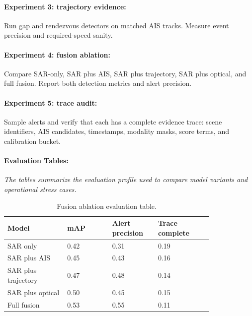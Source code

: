 \documentclass{article}
\begin{document}
\paragraph{Experiment 3: trajectory evidence:}

Run gap and rendezvous detectors on matched AIS tracks. Measure event precision and required-speed sanity.

\paragraph{Experiment 4: fusion ablation:}

Compare SAR-only, SAR plus AIS, SAR plus trajectory, SAR plus optical, and full fusion. Report both detection metrics and alert precision.

\paragraph{Experiment 5: trace audit:}

Sample alerts and verify that each has a complete evidence trace: scene identifiers, AIS candidates, timestamps, modality masks, score terms, and calibration bucket.

\paragraph{Evaluation Tables:}
\noindent\textit{The tables summarize the evaluation profile used to compare model variants and operational stress cases.}

\begin{table}[t]
\centering
\caption{Fusion ablation evaluation table.}
\begin{tabular}{@{}p{0.24\linewidth}p{0.18\linewidth}p{0.18\linewidth}p{0.22\linewidth}@{}}
\toprule
\textbf{Model} & \textbf{mAP} & \textbf{Alert precision} & \textbf{Trace complete}\\
\midrule
SAR only & 0.42 & 0.31 & 0.19\\
SAR plus AIS & 0.45 & 0.43 & 0.16\\
SAR plus trajectory & 0.47 & 0.48 & 0.14\\
SAR plus optical & 0.50 & 0.45 & 0.15\\
Full fusion & 0.53 & 0.55 & 0.11\\
\bottomrule
\end{tabular}
\end{table}
\end{document}
